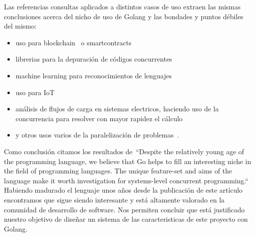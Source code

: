 Las referencias consultas aplicados a distintos casos de uso extraen las mismas conclusiones acerca del nicho de uso de Golang y las bondades y puntos débiles del mismo:

\begin{itemize}
	\item uso para blockchain~\cite{Ray202110857} o smartcontracts~\cite{Ding2021321}
	\item librerias para la depuración de códigos concurrentes~\cite{Taheri2021138}
	\item machine learning para reconocimientos de lenguajes~\cite{NoAuthor2021179,Dilley2019377}
	\item uso para IoT ~\cite{Samaniego2017116}
	\item análisis de flujos de carga en sistemas electricos, haciendo uso de la concurrencia para resolver con mayor rapidez el cálculo~\cite{Khaitan20152909}
	\item y otros usos varios de la paralelización de problemas~\cite{Qiu2018,Shoumik20181,Mladenovic2018,Benedict2017437,Irawan2017,Leokhin2015656,Komendantskaya2014121,Mittal2014292}.
\end{itemize}

Como conclusión citamos los resultados de~\cite{WhiteheadII2011209}“Despite the relatively young age of the programming language, we believe that Go helps to fill an interesting niche in the field of programming languages. The unique feature-set and aims of the language make it worth investigation for systems-level concurrent programming.“ Habiendo madurado el lenguaje unos años desde la publicación de este artículo encontramos que sigue siendo interesante y está altamente valorado en la comunidad de desarrollo de software. Nos permiten concluir que está justificado nuestro objetivo de diseñar un sistema de las caracteristicas de este proyecto con Golang.

